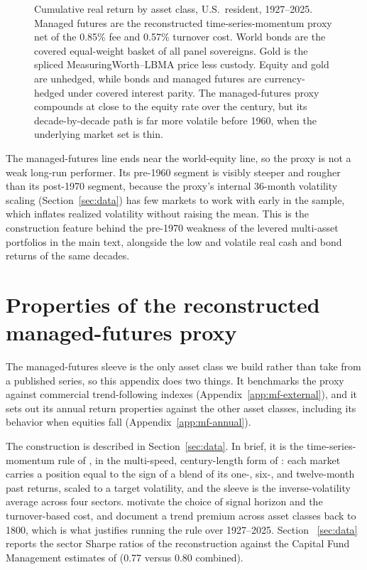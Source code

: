 \documentclass[11pt]{article}
\begin{document}
\begin{figure}[H]
\centering

\caption{Cumulative real return by asset class, U.S.\ resident, 1927--2025.
Managed futures are the reconstructed time-series-momentum proxy net of the
0.85\% fee and 0.57\% turnover cost. World bonds are the covered equal-weight
basket of all panel sovereigns. Gold is the spliced MeasuringWorth--LBMA price less custody.
Equity and gold are unhedged, while bonds and managed futures are currency-hedged
under covered interest parity. The managed-futures proxy compounds at close to
the equity rate over the century, but its decade-by-decade path is far more
volatile before 1960, when the underlying market set is thin.}
\label{fig:cumwealth}
\end{figure}

The managed-futures line ends near the world-equity line, so the proxy is not a
weak long-run performer. Its pre-1960 segment is visibly steeper and rougher
than its post-1970 segment, because the proxy's internal 36-month volatility
scaling (Section~\ref{sec:data}) has few markets to work with early in the
sample, which inflates realized volatility without raising the mean. This is the construction
feature behind the pre-1970 weakness of the levered multi-asset portfolios in
the main text, alongside the low and volatile real cash and bond returns of the
same decades.

\section{Properties of the reconstructed managed-futures proxy}
\label{app:mf-proxy}

The managed-futures sleeve is the only asset class we build rather than take
from a published series, so this appendix does two things. It benchmarks the
proxy against commercial trend-following indexes
(Appendix~\ref{app:mf-external}), and it sets out its annual return properties
against the other asset classes, including its behavior when equities fall
(Appendix~\ref{app:mf-annual}).

The construction is described in Section~\ref{sec:data}. In brief, it is the
time-series-momentum rule of \citet{MoskowitzOoiPedersen2012}, in the
multi-speed, century-length form of \citet{HurstOoiPedersen2017}: each market
carries a position equal to the sign of a blend of its one-, six-, and
twelve-month past returns, scaled to a target volatility, and the sleeve is the
inverse-volatility average across four sectors. \citet{BaltasKosowski2020}
motivate the choice of signal horizon and the turnover-based cost, and
\citet{LempiereEtAl2014} document a trend premium across asset classes back to
1800, which is what justifies running the rule over 1927--2025. Section~%
\ref{sec:data} reports the sector Sharpe ratios of the reconstruction against
the Capital Fund Management estimates of \citet{LempiereEtAl2014} (0.77 versus
0.80 combined).
\end{document}
